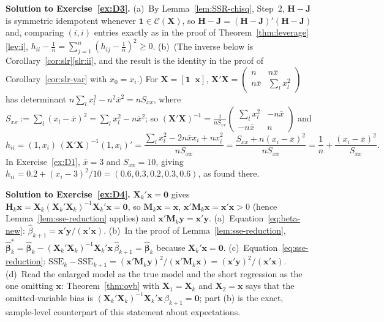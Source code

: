 \documentclass[12pt,a4paper]{article}
\theoremstyle{definition}
\newcommand{\SSE}{\mathrm{SSE}}
\newcommand{\bX}{\mathbf{X}}
\newcommand{\by}{\mathbf{y}}
\newcommand{\bx}{\mathbf{x}}
\def\bb{\boldsymbol{\beta}}
\newcommand{\bH}{\mathbf{H}}
\newcommand{\bM}{\mathbf{M}}
\newcommand{\bone}{\mathbf{1}}
\newcommand{\bzero}{\mathbf{0}}
\newcommand{\calC}{\mathcal{C}}
\newcommand{\bJ}{\mathbf{J}}
\begin{document}
\textbf{Solution to Exercise~\ref{ex:D3}.} (a)~By Lemma~\ref{lem:SSR-chisq}, Step~2, $\bH - \bJ$ is symmetric idempotent whenever $\bone \in \calC(\bX)$, so $\bH - \bJ = (\bH - \bJ)'(\bH - \bJ)$ and, comparing $(i,i)$ entries exactly as in the proof of Theorem~\ref{thm:leverage}\ref{lev:i}, $h_{ii} - \tfrac{1}{n} = \sum_{j=1}^n (h_{ij} - \tfrac{1}{n})^2 \geqslant 0$. (b)~(The inverse below is Corollary~\ref{cor:slr}\ref{slr:ii}, and the result is the identity in the proof of Corollary~\ref{cor:slr-var} with $x_0 = x_i$.) For $\bX = [\bone \;\; \bx]$, $\bX'\bX = \begin{pmatrix} n & n\bar x\\ n\bar x & \sum_l x_l^2\end{pmatrix}$ has determinant $n\sum_l x_l^2 - n^2\bar x^2 = nS_{xx}$, where $S_{xx} := \sum_l(x_l - \bar x)^2 = \sum_l x_l^2 - n\bar x^2$; so $(\bX'\bX)^{-1} = \frac{1}{nS_{xx}}\begin{pmatrix}\sum_l x_l^2 & -n\bar x\\ -n\bar x & n\end{pmatrix}$ and
\[
h_{ii} = (1, x_i)\,(\bX'\bX)^{-1}(1, x_i)' = \frac{\sum_l x_l^2 - 2n\bar x x_i + n x_i^2}{nS_{xx}} = \frac{S_{xx} + n(x_i - \bar x)^2}{nS_{xx}} = \frac{1}{n} + \frac{(x_i - \bar x)^2}{S_{xx}}.
\]
In Exercise~\ref{ex:D1}, $\bar x = 3$ and $S_{xx} = 10$, giving $h_{ii} = 0.2 + (x_i - 3)^2/10 = (0.6, 0.3, 0.2, 0.3, 0.6)$, as found there.

\textbf{Solution to Exercise~\ref{ex:D4}.} $\bX_k'\bx = \bzero$ gives $\bH_k\bx = \bX_k(\bX_k'\bX_k)^{-1}\bX_k'\bx = \bzero$, so $\bM_k\bx = \bx$, $\bx'\bM_k\bx = \bx'\bx > 0$ (hence Lemma~\ref{lem:sse-reduction} applies) and $\bx'\bM_k\by = \bx'\by$. (a)~Equation~\eqref{eq:beta-new}: $\hat\beta_{k+1} = \bx'\by/(\bx'\bx)$. (b)~In the proof of Lemma~\ref{lem:sse-reduction}, $\hat{\bb}_k^* = \hat{\bb}_k - (\bX_k'\bX_k)^{-1}\bX_k'\bx\,\hat\beta_{k+1} = \hat{\bb}_k$ because $\bX_k'\bx = \bzero$. (c)~Equation~\eqref{eq:sse-reduction}: $\SSE_k - \SSE_{k+1} = (\bx'\bM_k\by)^2/(\bx'\bM_k\bx) = (\bx'\by)^2/(\bx'\bx)$. (d)~Read the enlarged model as the true model and the short regression as the one omitting $\bx$: Theorem~\ref{thm:ovb} with $\bX_1 = \bX_k$ and $\bX_2 = \bx$ says that the omitted-variable bias is $(\bX_k'\bX_k)^{-1}\bX_k'\bx\,\beta_{k+1} = \bzero$; part (b) is the exact, sample-level counterpart of this statement about expectations.
\end{document}

